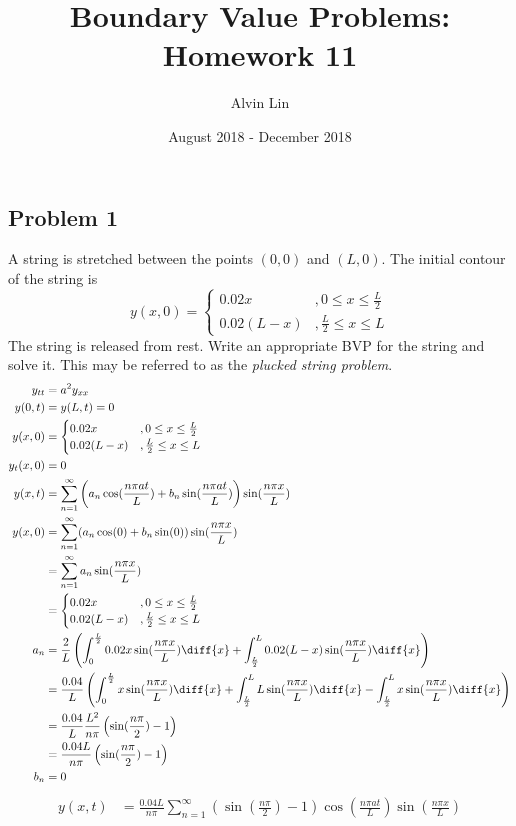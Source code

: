 \documentclass{math}
\title{Boundary Value Problems: Homework 11}
\author{Alvin Lin}
\date{August 2018 - December 2018}
\begin{document}
\maketitle

\subsection*{Problem 1}
A string is stretched between the points \( (0,0) \) and \( (L,0) \). The
initial contour of the string is
\[ y(x,0) = \begin{cases}
  0.02x &, 0\le x\le\frac{L}{2} \\
  0.02(L-x) &, \frac{L}{2}\le x\le L
\end{cases} \]
The string is released from rest. Write an appropriate BVP for the string
and solve it. This may be referred to as the \textit{plucked string problem}.
\begin{align*}
  y_{tt} &= a^2y_{xx} \\
  y(0,t) &= y(L,t) = 0 \\
  y(x,0) &= \begin{cases}
    0.02x &, 0\le x\le\frac{L}{2} \\
    0.02(L-x) &, \frac{L}{2}\le x\le L
  \end{cases} \\
  y_t(x,0) &= 0 \\
  y(x,t) &= \sum_{n=1}^{\infty}\left(a_n\cos(\frac{n\pi at}{L})+
    b_n\sin(\frac{n\pi at}{L})\right)\sin(\frac{n\pi x}{L}) \\
  y(x,0) &= \sum_{n=1}^{\infty}(a_n\cos(0)+b_n\sin(0))
    \sin(\frac{n\pi x}{L}) \\
  &= \sum_{n=1}^{\infty}a_n\sin(\frac{n\pi x}{L}) \\
  &= \begin{cases}
    0.02x &, 0\le x\le\frac{L}{2} \\
    0.02(L-x) &, \frac{L}{2}\le x\le L
  \end{cases} \\
  a_n &= \frac{2}{L}\left(
    \int_{0}^{\frac{L}{2}}0.02x\sin(\frac{n\pi x}{L})\diff{x}+
    \int_{\frac{L}{2}}^{L}0.02(L-x)\sin(\frac{n\pi x}{L})\diff{x}\right) \\
  &= \frac{0.04}{L}\left(
    \int_{0}^{\frac{L}{2}}x\sin(\frac{n\pi x}{L})\diff{x}+
    \int_{\frac{L}{2}}^{L}L\sin(\frac{n\pi x}{L})\diff{x}-
    \int_{\frac{L}{2}}^{L}x\sin(\frac{n\pi x}{L})\diff{x}\right) \\
  &= \frac{0.04}{L}\frac{L^2}{n\pi}\left(\sin(\frac{n\pi}{2})-1\right) \\
  &= \frac{0.04L}{n\pi}\left(\sin(\frac{n\pi}{2})-1\right) \\
  b_n &= 0 \\
\end{align*}
\begin{align*}
  y(x,t) &= \frac{0.04L}{n\pi}\sum_{n=1}^{\infty}(\sin(\frac{n\pi}{2})-1)
    \cos(\frac{n\pi at}{L})\sin(\frac{n\pi x}{L}) \\
\end{align*}
\end{document}
